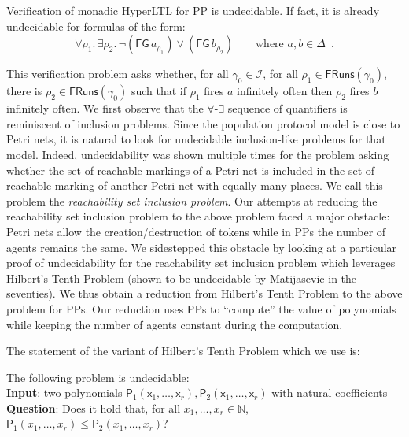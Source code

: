 \documentclass[10pt,a4paper]{article}
\let\mathbb\mathds
\renewcommand{\leq}{\leqslant}
\newcommand{\nats}{\mathbb{N}}
\newcommand{\atrace}{\run}
\newcommand{\fairrunsfrom}[1]{\mathsf{FRuns}(#1)}
\newcommand{\config}{\gamma}
\newcommand{\initialconfigs}{\mathcal{I}}
\newcommand{\run}{\rho}
\newcommand{\transitions}{\Delta}
\newcommand*{\apoly}{\mathsf{P}}
\newcommand{\varx}{\mathsf{x}}
\newcommand{\ltlglobally}{\mathsf{G}}
\newcommand{\ltlfinally}{\mathsf{F}}
\begin{document}
%
%

%
%
%
%
%
%
%

%

%
%
%
%
%
%
%
%
%
%
%
%
%
%
%
%
%
%
%
%
%
%
%
%
%
%
%
%
%
%
%
%
%
%
%
%
%
%
%
%
%
%
%

%
%
%
\begin{theorem}
	\label{monadic-undec-pp}
	Verification of monadic HyperLTL for PP is undecidable.
	If fact, it is already undecidable for formulas of the form: \[\forall \atrace_1.
		\, \exists \atrace_2. \, \neg (\ltlfinally \ltlglobally \,a_{\atrace_1}) \lor (\ltlfinally \ltlglobally \,b_{\atrace_2})  \qquad \text{where } a, b \in \transitions\enspace. \]
\end{theorem}

%
This verification problem asks whether, for all \(\config_0 \in \initialconfigs\), for all \(\run_1 \in \fairrunsfrom{\config_0}\), there is \(\run_2 \in \fairrunsfrom{\config_0}\) such that if \(\run_1\) fires \(a\) infinitely often then \(\run_2\) fires \(b\) infinitely often.
We first observe that the \(\forall\)-\(\exists\) sequence of quantifiers is reminiscent of inclusion problems.
Since the population protocol model is close to Petri nets, it is natural to look for undecidable inclusion-like problems for that model.
Indeed, undecidability was shown multiple times \cite{baker1973rabin,Hack76} for the problem asking whether the set of reachable markings of a Petri net is included in the set of reachable marking of another Petri net with equally many places.
We call this problem the \emph{reachability set inclusion problem}.
Our attempts at reducing the reachability set inclusion problem to the above problem faced a major obstacle: Petri nets allow the creation/destruction of tokens while in PPs the number of agents remains the same.
We sidestepped this obstacle by looking at a particular proof of undecidability for the reachability set inclusion problem which leverages Hilbert's Tenth Problem (shown to be undecidable by Matijasevic in the seventies).
We thus obtain a reduction from Hilbert's Tenth Problem to the above problem for PPs.
Our reduction uses PPs to ``compute'' the value of polynomials while keeping the number of agents constant during the computation.

%
The statement of the variant of Hilbert's Tenth Problem which we use is:

\begin{proposition}
	\label{hilbert-variant-undec}
	The following problem is undecidable: \\ \textbf{Input}: two polynomials \(\apoly_1(\varx_1, \dots, \varx_r), \apoly_2(\varx_1, \dots, \varx_r)\) with natural coefficients \\ \textbf{Question}: Does it hold that, for all \(x_1, \dots, x_r \in \nats\), \(\apoly_1(x_1, \dots, x_r) \leq \apoly_2(x_1, \dots, x_r)\)?
\end{proposition}
\end{document}
